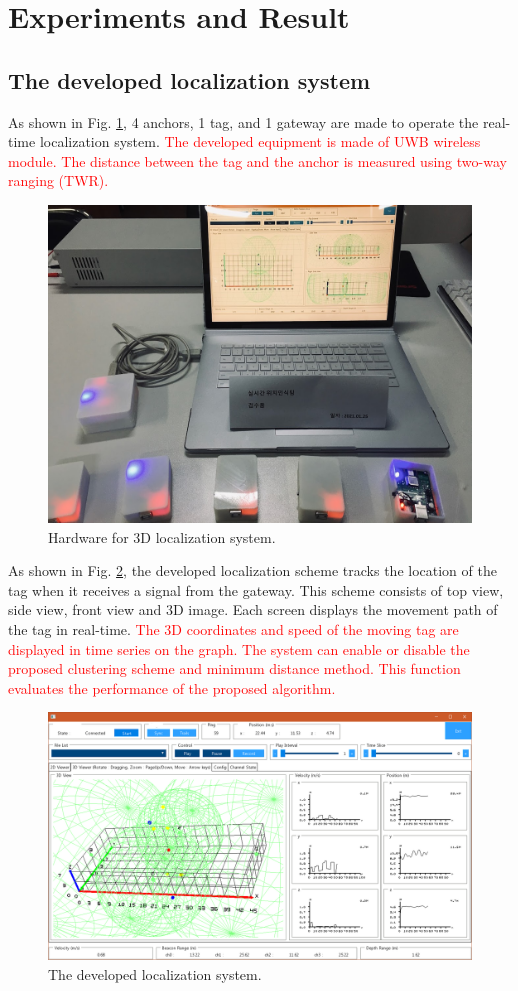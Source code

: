 \documentclass[conference]{IEEEtran}
\begin{document}
\section{Experiments and Result}
\subsection{The developed localization system}

As shown in Fig. \ref{fig10}, 4 anchors, 1 tag, and 1 gateway are made to operate the real-time localization system. \textcolor{red}{The developed equipment is made of UWB wireless module. The distance between the tag and the anchor is measured using two-way ranging (TWR).}

\begin{figure}[htbp]
    \centerline{\includegraphics[width=0.8\columnwidth]{fig10.jpg}}
    \caption{Hardware for 3D localization system.}
    \label{fig10}
\end{figure}

As shown in Fig. \ref{fig5}, the developed localization scheme tracks the location of the tag when it receives a signal from the gateway. This scheme consists of top view, side view, front view and 3D image. Each screen displays the movement path of the tag in real-time. \textcolor{red}{The 3D coordinates and speed of the moving tag are displayed in time series on the graph. The system can enable or disable the proposed clustering scheme and minimum distance method. This function evaluates the performance of the proposed algorithm.}

\begin{figure}[htbp]
    \centerline{\includegraphics[width=0.8\columnwidth]{fig5.png}}
    \caption{The developed localization system.}
    \label{fig5}
\end{figure}
\end{document}
